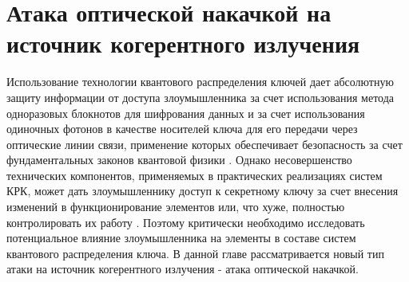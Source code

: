\chapter{Атака оптической накачкой на источник когерентного излучения}\label{ch:ch4}
\renewcommand{\thefigure}{4.\arabic{figure}} %
\setcounter{figure}{0}                     %
\renewcommand{\thetable}{4.\arabic{table}}



Использование технологии квантового распределения ключей дает абсолютную защиту информации от доступа злоумышленника за счет использования метода одноразовых блокнотов для шифрования данных и за счет использования одиночных фотонов в качестве носителей ключа для его передачи через оптические линии связи, применение которых обеспечивает безопасность за счет фундаментальных законов квантовой физики \cite{bennett1984,horodecki2008}. Однако несовершенство технических компонентов, применяемых в практических реализациях систем КРК, может дать злоумышленнику доступ к секретному ключу за счет внесения изменений в функционирование элементов или, что хуже, полностью контролировать их работу \cite{lo2014,dixon2017,xu2020,makarov2023}. Поэтому критически необходимо исследовать потенциальное влияние злоумышленника на элементы в составе систем квантового распределения ключа. В данной главе рассматривается новый тип атаки на источник когерентного излучения - атака оптической накачкой.

